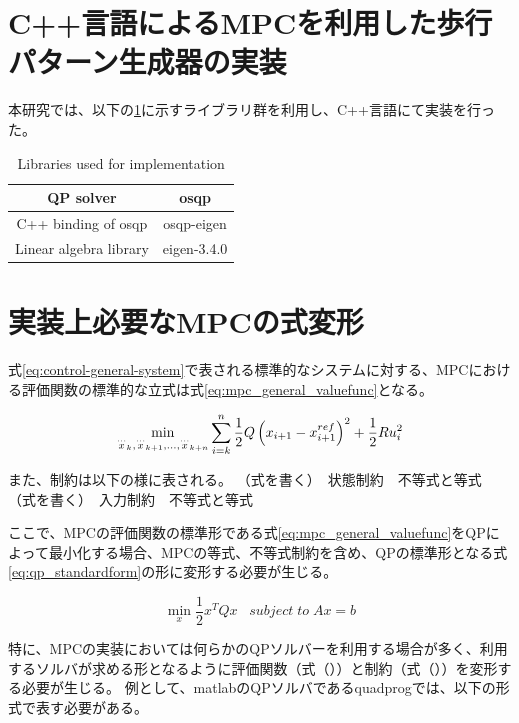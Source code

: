 \section{C++言語によるMPCを利用した歩行パターン生成器の実装}

本研究では、以下の\ref{tb:library}に示すライブラリ群を利用し、C++言語にて実装を行った。

\begin{table}[htbp]
  \centering
  \begin{tabular}{|c|c|} \hline
    QP solver              & osqp\cite{OSQP}            \\ \hline
    C++ binding of osqp    & osqp-eigen\cite{OSQPEIGEN} \\ \hline
    Linear algebra library & eigen-3.4.0\cite{EIGEN}    \\ \hline
  \end{tabular}
  \caption{Libraries used for implementation}
  \label{tb:library}
\end{table}


\section{実装上必要なMPCの式変形}
式\eqref{eq:control-general-system}で表される標準的なシステムに対する、MPCにおける評価関数の標準的な立式は式\eqref{eq:mpc_general_valuefunc}となる。

\begin{equation}
  \min_{{\buildrel\ldots\over{x}}_{k},{\buildrel\ldots\over{x}}_{k+1},\ldots,{\buildrel\ldots\over{x}}_{k+n}}\sum_{i=k}^{n}{1\over 2}Q\left(x_{i+1}-x_{i+1}^{ref}\right)^{2}+{1\over 2}R{u}_{i}^{2}
  \label{eq:mpc_general_valuefunc}
\end{equation}

また、制約は以下の様に表される。
（式を書く）　状態制約　不等式と等式
（式を書く）　入力制約　不等式と等式

ここで、MPCの評価関数の標準形である式\eqref{eq:mpc_general_valuefunc}をQPによって最小化する場合、MPCの等式、不等式制約を含め、QPの標準形となる式\eqref{eq:qp_standardform}の形に変形する必要が生じる。

\begin{equation}
  \underset{x}{\min} \frac{1}{2}x^TQx \;\;\; subject \; to \; Ax = b
  \label{eq:qp_standardform}
\end{equation}

特に、MPCの実装においては何らかのQPソルバーを利用する場合が多く、利用するソルバが求める形となるように評価関数（式（））と制約（式（））を変形する必要が生じる。
例として、matlab\cite{MATLAB:2021}のQPソルバであるquadprog\cite{MATLABQUADPLOG}では、以下の形式で表す必要がある。

